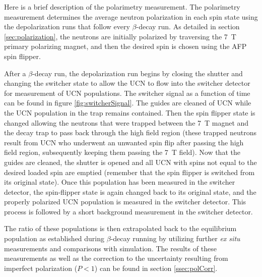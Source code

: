 Here is a brief description of the polarimetry measurement.
The polarimetry measurement determines the average neutron polarization in each spin state using
the depolarization runs that follow every $\beta$-decay run. As detailed in section
\ref{sec:polarization}, the neutrons are initially polarized by traversing the 7~T primary
polarizing magnet, and then the desired spin is chosen using the AFP spin flipper.

After a $\beta$-decay run, the depolarization run begins by closing the shutter and changing the switcher
state to allow
the UCN to flow into the switcher detector for measurement of UCN populations. The switcher signal
as a function of time can be found in figure \ref{fig:switcherSignal}. The guides are cleaned of UCN while
the UCN population in the trap remains contained. Then the spin flipper state is changed allowing the
neutrons that were trapped between the 7~T magnet and the decay trap to pass back through the high
field region (these trapped neutrons result from UCN who underwent an unwanted spin flip after passing
the high field region, subsequently keeping them passing the 7~T field). Now that the guides are cleaned,
the shutter is opened and all UCN with spins not equal to the desired loaded spin are emptied (remember that
the spin flipper is switched from its original state). Once this population has been measured in the
switcher detector, the spin-flipper state is again changed back to its original state, and the
properly polarized UCN population is measured in the switcher detector. This process is followed by a short
background measurement in the switcher detector.

The ratio of these populations is then extrapolated back to the equilibrium population as established
during $\beta$-decay running by utilizing further \textit{ex situ} measurements and comparisons with
simulation. The results of these measurements as well as the correction to the uncertainty resulting
from imperfect polarization ($P<1$) can be found in section \ref{ssec:polCorr}.





